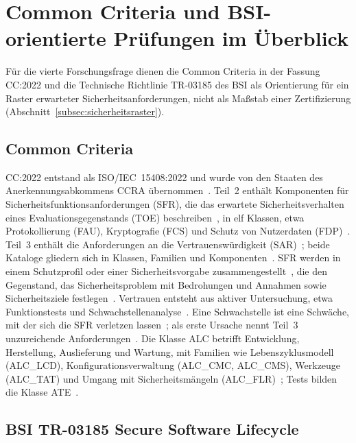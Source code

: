 \documentclass[11pt,a4paper]{report}
\begin{document}
\section{Common Criteria und BSI-orientierte Prüfungen im Überblick}
\label{sec:cc-bsi}

Für die vierte Forschungsfrage dienen die Common Criteria in der
Fassung CC:2022 und die Technische Richtlinie TR-03185 des BSI als
Orientierung für ein Raster erwarteter Sicherheitsanforderungen, nicht
als Maßstab einer Zertifizierung
(Abschnitt~\ref{subsec:sicherheitsraster}).

\subsection{Common Criteria}
\label{subsec:common-criteria}

CC:2022 entstand als ISO/IEC~15408:2022 und wurde von den Staaten des
Anerkennungsabkommens CCRA übernommen~\cite[Vorwort]{cc2022teil2}.
Teil~2 enthält Komponenten für Sicherheitsfunktionsanforderungen (SFR),
die das erwartete Sicherheitsverhalten eines Evaluationsgegenstands
(TOE) beschreiben~\cite[Einleitung und Abschn.~1]{cc2022teil2}, in elf
Klassen, etwa Protokollierung (FAU), Kryptografie (FCS) und Schutz von
Nutzerdaten (FDP)~\cite[Abschn.~8--18]{cc2022teil2}. Teil~3 enthält die
Anforderungen an die Vertrauenswürdigkeit (SAR)~\cite[Abschn.~7.7.1]{cc2022teil3};
beide Kataloge gliedern sich in Klassen, Familien und
Komponenten~\cite[Abschn.~7.1.1]{cc2022teil2}\cite[Abschn.~6.2]{cc2022teil3}.
SFR werden in einem Schutzprofil oder einer Sicherheitsvorgabe
zusammengestellt~\cite[Einleitung]{cc2022teil2}, die den Gegenstand,
das Sicherheitsproblem mit Bedrohungen und Annahmen sowie
Sicherheitsziele festlegen~\cite[Abschn.~7.2.2, 7.4.2, 7.5.1 und
9.4.2]{cc2022teil3}. Vertrauen entsteht aus aktiver Untersuchung, etwa
Funktionstests und Schwachstellenanalyse~\cite[Abschn.~5.3.4 und
5.3.5]{cc2022teil3}. Eine Schwachstelle ist eine Schwäche, mit der sich
die SFR verletzen lassen~\cite[Abschn.~3.28]{cc2022teil3}; als erste
Ursache nennt Teil~3 unzureichende
Anforderungen~\cite[Abschn.~5.3.3]{cc2022teil3}. Die Klasse ALC
betrifft Entwicklung, Herstellung, Auslieferung und Wartung, mit
Familien wie Lebenszyklusmodell (ALC\_LCD), Konfigurationsverwaltung
(ALC\_CMC, ALC\_CMS), Werkzeuge (ALC\_TAT) und Umgang mit
Sicherheitsmängeln (ALC\_FLR)~\cite[Abschn.~12.1]{cc2022teil3}; Tests
bilden die Klasse ATE~\cite[Kap.~13]{cc2022teil3}.

\subsection{BSI TR-03185 Secure Software Lifecycle}
\label{subsec:tr03185}
\end{document}
